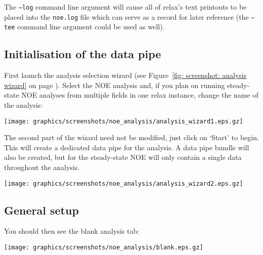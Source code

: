 
The \texttt{--log} command line argument will cause all of relax's text printouts to be placed into the \texttt{noe.log} file which can serve as a record for later reference (the \texttt{--tee} command line argument could be used as well).



\subsection{Initialisation of the data pipe}

First launch the analysis selection wizard (see Figure~\ref{fig: screenshot: analysis wizard} on page \pageref{fig: screenshot: analysis wizard}).  Select the NOE analysis and, if you plan on running steady-state NOE analyses from multiple fields in one relax instance, change the name of the analysis:

\begin{minipage}[h]{\linewidth}
\centerline{\texttt{[image: graphics/screenshots/noe\_analysis/analysis\_wizard1.eps.gz]}}
\end{minipage}

The second part of the wizard need not be modified, just click on `Start' to begin.  This will create a dedicated data pipe for the analysis.  A data pipe bundle will also be created, but for the steady-state NOE will only contain a single data throughout the analysis.

\begin{minipage}[h]{\linewidth}
\centerline{\texttt{[image: graphics/screenshots/noe\_analysis/analysis\_wizard2.eps.gz]}}
\end{minipage}



\subsection{General setup}

You should then see the blank analysis tab:

\begin{minipage}[h]{\linewidth}
\centerline{\texttt{[image: graphics/screenshots/noe\_analysis/blank.eps.gz]}}
\end{minipage}

